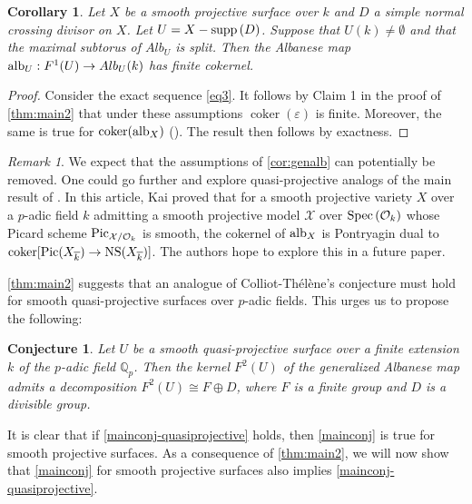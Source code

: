 \documentclass[12pt]{amsart}
\newtheorem{cor}[cor]{Corollary}
\newtheorem{conj}[conj]{Conjecture}
\theoremstyle{remark}
\newtheorem{rem}[rem]{Remark}
\newcommand{\Q}{{\mathbb Q}}
\renewcommand{\1}{{\mathbb{S}}}
\newcommand{\alb}{{\rm alb}}
\newcommand{\Pic}{{\rm Pic}}
\newcommand{\Spec}{{\rm Spec \,}}
\newcommand{\supp}{{\rm supp}\,}
\newcommand{\NS}{{\operatorname{NS}}}
\newcommand{\<}{\langle}
\renewcommand{\>}{\rangle}
\newcommand{\cok}{{\operatorname{coker}}}
\begin{document}
   
\begin{cor}\label{cor:genalb} Let $X$ be a smooth projective surface over $k$ and $D$ a simple normal crossing divisor on $X$. Let $U=X-\supp(D)$. Suppose that $U(k)\neq\emptyset$ and that the maximal subtorus of $Alb_U$ is split.  Then the Albanese map $\alb_U: F^1(U)\to Alb_U(k)$ has finite cokernel. 
\end{cor}
\begin{proof}
Consider the exact sequence \eqref{eq3}. It follows by Claim 1 in the proof of \autoref{thm:main2} that under these assumptions $\cok(\varepsilon)$ is finite. Moreover, the same is true for  $\cok(\alb_X)$ (\cite[p.~409]{SSu}). The result then follows by exactness. 

\end{proof}


\begin{rem}
    We expect that the assumptions of \autoref{cor:genalb} can potentially be removed. One could go further and explore quasi-projective analogs of the main result of \cite{Kai}. In this article, Kai proved that for a smooth projective variety $X$ over a $p$-adic field $k$ admitting a smooth projective model $\mathcal{X}$ over $\Spec(\mathcal{O}_k)$ whose Picard scheme $\Pic_{\mathcal{X}/\mathcal{O}_k}$ is smooth, the cokernel of $\alb_X$ is Pontryagin dual to  $\cok[\Pic(X_{\overline{k}})\to \NS(X_{\overline{k}})]$. The authors hope to explore this in a future paper. 
\end{rem}


\autoref{thm:main2} suggests that an analogue of Colliot-Thélène's conjecture must hold for smooth quasi-projective surfaces over \( p \)-adic fields. 
 This urges us to propose the following:

\begin{conj}\label{mainconj-quasiprojective}
Let \( U \) be a smooth quasi-projective surface over a finite extension \( k \) of the \( p \)-adic field \( \Q_p \). Then the kernel \( F^{2}(U) \) of the generalized Albanese map admits a decomposition \( F^{2}(U) \cong F \oplus D \), where \( F \) is a finite group and \( D \) is a divisible group.
\end{conj}

It is clear that if \autoref{mainconj-quasiprojective} holds, then \autoref{mainconj} is true for smooth projective surfaces. As a consequence of \autoref{thm:main2}, we will now show that \autoref{mainconj} for smooth projective surfaces also implies \autoref{mainconj-quasiprojective}.
\end{document}
